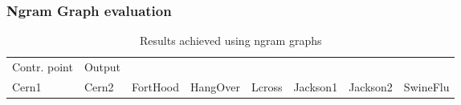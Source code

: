 \subsubsection*{Ngram Graph evaluation}
\begin{table*}
	\centering
	\begin{tabularx}{\textwidth}{|l|X|}
		\hline
		Contr. point & Output \\
		Cern1		&
		Cern2		&
		FortHood	&
		HangOver	&
		Lcross		&
		Jackson1	&
		Jackson2	&
		SwineFlu	&
	\end{tabularx}
	\caption{Results achieved using ngram graphs}
	\label{tab:resultsNGG}
\end{table*}

